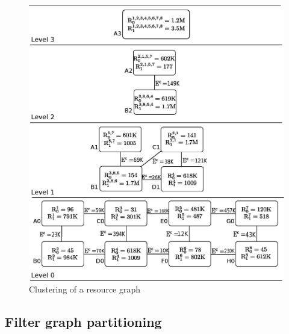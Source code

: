 \begin{figure}[ht]
  \includegraphics[scale=0.43]{./figures/resource}
  \caption{Clustering of a resource graph}
  \label{fig:res}
\end{figure}



\subsection{Filter graph partitioning}
\label{sec:filter-graph-part}

